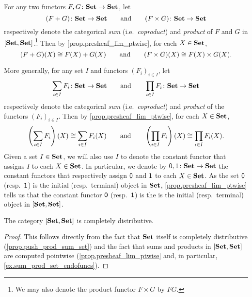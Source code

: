 \documentclass[Book-Poly]{subfiles}
\begin{document}
\begin{example}\label{ex.sum_prod_set_endofuncs}
For any two functors $F,G\colon\mathbf{Set}\to\mathbf{Set}$, let
\[
  (F+G)\colon\mathbf{Set}\to\mathbf{Set}
  \qquad\text{and}\qquad
  (F\times G)\colon\mathbf{Set}\to\mathbf{Set}
\]
respectively denote the categorical \emph{sum} (i.e.\ \emph{coproduct}) and \emph{product} of $F$ and $G$ in $[\mathbf{Set},\mathbf{Set}]$.\footnote{We may also denote the product functor $F \times G$ by $FG$.}
Then by \cref{prop.presheaf_lim_ptwise}, for each $X\in\mathbf{Set}$,
\[
  (F+G)(X)\cong F(X)+G(X)
  \qquad\text{and}\qquad
	(F\times G)(X)\cong F(X)\times G(X).
\]

More generally, for any set $I$ and functors $(F_i)_{i\in I}$, let
\[
\sum_{i\in I}F_i\colon\mathbf{Set}\to\mathbf{Set}
\qquad\text{and}\qquad
\prod_{i\in I}F_i\colon\mathbf{Set}\to\mathbf{Set}
\]
respectively denote the categorical \emph{sum} (i.e.\ \emph{coproduct}) and \emph{product} of the functors $(F_i)_{i\in I}$.
Then by \cref{prop.presheaf_lim_ptwise}, for each $X\in\mathbf{Set}$,
\[
	\left(\sum_{i\in I}F_i\right)(X)\cong\sum_{i\in I} F_i(X)
	\qquad\text{and}\qquad
	\left(\prod_{i\in I}F_i\right)(X)\cong\prod_{i\in I} F_i(X).
\]
Given a set $I\in\mathbf{Set}$, we will also use $I$ to denote the constant functor that assigns $I$ to each $X\in\mathbf{Set}$.
In particular, we denote by $\textsf{0},\textsf{1}\colon\mathbf{Set}\to\mathbf{Set}$ the constant functors that respectively assign $\textsf{0}$ and $\textsf{1}$ to each $X\in\mathbf{Set}$.
As the set $\textsf{0}$ (resp.\ $\textsf{1}$) is the initial (resp.\ terminal) object in $\mathbf{Set}$, \cref{prop.presheaf_lim_ptwise} tells us that the constant functor $\textsf{0}$ (resp.\ $\textsf{1}$) is the is the initial (resp.\ terminal) object in $[\mathbf{Set},\mathbf{Set}]$.
\end{example}

\begin{proposition}\label{prop.set_endofunc_distrib}
The category $[\mathbf{Set},\mathbf{Set}]$ is completely distributive.
\end{proposition}
\begin{proof}
This follows directly from the fact that $\mathbf{Set}$ itself is completely distributive (\cref{prop.push_prod_sum_set}) and the fact that sums and products in $[\mathbf{Set},\mathbf{Set}]$ are computed pointwise (\cref{prop.presheaf_lim_ptwise} and, in particular, \cref{ex.sum_prod_set_endofuncs}).
\end{proof}
\end{document}
